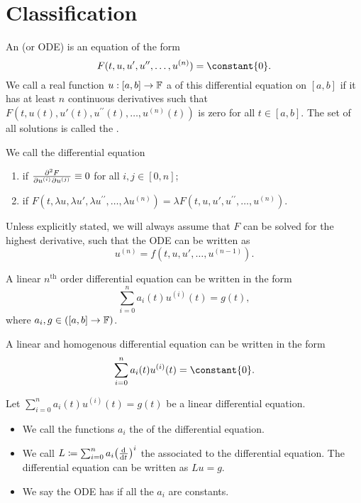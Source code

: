 \section{Classification}
\begin{definition}
An  (or ODE) is an equation of the form
\[ F(t, u, u', u^{\prime\prime}, \ldots, u^{(n)}) = \constant{0}. \]
We call a real function $u: [a,b] \to \mathbb{F}$ a  of this differential equation on $[a,b]$
if it has at least $n$ continuous derivatives such that $F(t, u(t), u'(t), u^{\prime\prime}(t), \ldots, u^{(n)}(t))$ is zero for all $t\in [a,b]$. The set of all solutions is called the .

We call the differential equation
\begin{enumerate}
\item {} if $\md{F}{2}{u^{(i)}}{}{u^{(j)}}{} \equiv 0$ for all $i,j\in [0,n]$;
\item {} if $F(t, \lambda u, \lambda u', \lambda u^{\prime\prime}, \ldots, \lambda u^{(n)}) = \lambda F(t, u, u', u^{\prime\prime}, \ldots, u^{(n)})$.
\end{enumerate}
Unless explicitly stated, we will always assume that $F$ can be solved for the highest derivative, such that the ODE can be written as
\[ u^{(n)} = f(t,u,u',\ldots, u^{(n-1)}). \]
\end{definition}

\begin{lemma}
A linear $n^\text{th}$ order differential equation can be written in the form
\[ \sum_{i=0}^n a_{i}(t)u^{(i)}(t)  =  g(t), \]
where $a_i, g \in (\interval{a,b}\to\F)$.

A linear and homogenous differential equation can be written in the form 
\[ \sum_{i=0}^n a_{i}(t)u^{(i)}(t) = \constant{0}. \]
\end{lemma}

\begin{definition}
Let $\sum_{i=0}^n a_{i}(t)u^{(i)}(t) = g(t)$ be a linear differential equation. 
\begin{itemize}
\item We call the functions $a_i$ the  of the differential equation.
\item We call $L \defeq \sum_{i=0}^n a_{i} \big(\od{}{t}\big)^i$ the  associated to the differential equation. The differential equation can be written as $Lu = g$.
\item We say the ODE has  if all the $a_i$ are constants.
\end{itemize}
\end{definition}

